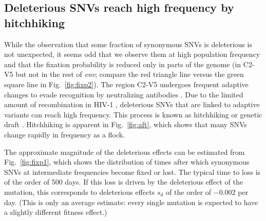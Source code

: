 \documentclass[rmp, twocolumn]{revtex4}
\newcommand{\FIG}[1]{Fig.~\ref{fig:#1}}
\newcommand{\env}{\textit{env}}
\newcommand{\shankaregion}{C2-V5}
\begin{document}
\subsection*{Deleterious SNVs reach high frequency by hitchhiking}

While the observation that some fraction of synonymous SNVs is deleterious
is not unexpected, it seems odd that we observe them at high population
frequency and that the fixation probability is reduced only in parts of the
genome (in \shankaregion{} but not in the rest of \env{}; compare the red
triangle line versus the green square line in \FIG{fixp2}).
The region \shankaregion{} undergoes frequent adaptive changes to evade
recognition by neutralizing antibodies \cite{williamson_adaptation_2003,
richman_rapid_2003}. Due to the limited amount of recombination in HIV-1
\cite{neher_recombination_2010, batorsky_estimate_2011}, deleterious SNVs
that are linked to adaptive variants can reach high frequency. This process is
known as hitchhiking \citep{smith_hitch-hiking_1974} or genetic draft
\citep{gillespie_genetic_2000,neher_genetic_2011}. Hitchhiking is apparent in
\FIG{aft}, which shows that many SNVs change rapidly in frequency as a
flock. 

The approximate magnitude of the deleterious effects can be estimated from
\FIG{fixp1}, which shows the distribution of times after which synonymous
SNVs at intermediate frequencies become fixed or lost. The typical time to
loss is of the order of 500 days. If this loss is driven by the deleterious
effect of the mutation, this corresponds to deleterious effects $s_d$ of the
order of $- 0.002$ per day. (This is only an average estimate: every single
mutation is expected to have a slightly different fitness effect.)
\end{document}

